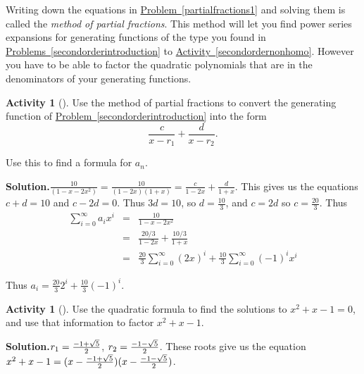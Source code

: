 \documentclass[10pt,]{book}
\theoremstyle{plain}
\theoremstyle{definition}
\newtheorem{activity}[project]{Activity}
\numberwithin{equation}{chapter}
\newcommand{\amp}{&}
\begin{document}
Writing down the equations in \hyperref[partialfractions1]{Problem~\ref{partialfractions1}} and solving them is called the \emph{method of partial fractions}. This method will let you find power series expansions for generating functions of the type you found in \hyperref[secondorderintroduction]{Problems~\ref{secondorderintroduction}} to \hyperref[secondordernonhomo]{Activity~\ref{secondordernonhomo}}. However you have to be able to factor the quadratic polynomials that are in the denominators of your generating functions.%
\begin{activity}[]\label{activity-191}
Use the method of partial fractions to convert the generating function of \hyperref[secondorderintroduction]{Problem~\ref{secondorderintroduction}} into the form%
\begin{equation*}
\frac{c}{x-r_1} + \frac{d}{x-r_2}.
\end{equation*}
%
\par
Use this to find a formula for \(a_n\).%
\par\medskip\noindent%
\textbf{Solution.}\quad \(\frac{10}{(1-x-2x^2)}=\frac{10}{(1-2x)(1+x)} = \frac{c}{1-2x} +\frac{d}{1+x}\). This gives us the equations \(c+d=10\) and \(c-2d=0\). Thus \(3d=10\), so \(d=\frac{10}{3}\), and \(c=2d\) so \(c=\frac{20}{3}\). Thus%
\begin{align*}
\sum_{i=0}^\infty a_ix^i \amp =\amp  \frac{10}{1-x-2x^2}\\
\amp =\amp \frac{20/3}{1-2x} + \frac{10/3}{1+x}\\
\amp =\amp \frac{20}{3}\sum_{i=0}^\infty (2x)^i + \frac{10}{3}\sum_{i=0}^\infty (-1)^ix^i
\end{align*}
%
\par
Thus \(a_i=\frac{20}{3}2^i +\frac{10}{3}(-1)^i\).%
\end{activity}
\begin{activity}[]\label{factorFibonacci}
Use the quadratic formula to find the solutions to \(x^2+x-1=0\), and use that information to factor \(x^2+x-1\).%
\par\medskip\noindent%
\textbf{Solution.}\quad \(r_1={-1+\sqrt{5}\over2}\), \(r_2 = {-1-\sqrt{5}\over 2}\). These roots give us the equation \(x^2+x-1=(x-{-1+\sqrt{5}\over2})(x-{-1-\sqrt{5}\over 2})\).%
\end{activity}
\end{document}

